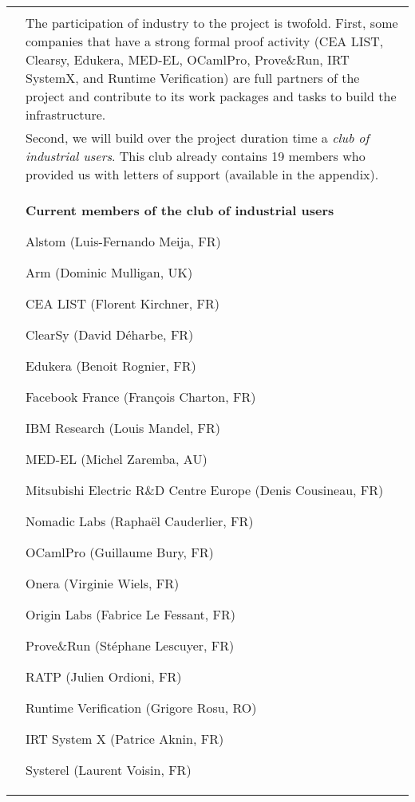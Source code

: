 \begin{longtable}{|p{}|p{}|}
&\\
&
\hspace{0.4cm}
The participation of industry to the project is twofold. First,
some companies that have a strong formal proof activity (CEA
LIST, Clearsy, Edukera, MED-EL, OCamlPro, Prove\&Run, IRT SystemX,
and Runtime Verification) are full partners of the project and
contribute to its work packages and tasks to build the
infrastructure.
\\
&
\hspace{0.4cm}
Second, we will build over the project duration time a {\em club of
  industrial users}. This club already contains
19 members who provided us with letters of support (available in the appendix).
\\
&
\hspace{0.4cm}
\begin{framed}
\begin{center}
  {\bf \Large Current members of the club of industrial users}
\end{center}
\begin{compactitem}%
\item Alstom (Luis-Fernando Meija, FR)
\item Arm (Dominic Mulligan, UK)
\item CEA LIST (Florent Kirchner, FR)
\item ClearSy (David Déharbe, FR)
\item Edukera (Benoit Rognier, FR)
\item Facebook France (François Charton, FR)
\item IBM Research (Louis Mandel, FR)
\item MED-EL (Michel Zaremba, AU)
\item Mitsubishi Electric R\&D Centre Europe (Denis Cousineau, FR)
\item Nomadic Labs (Raphaël Cauderlier, FR)
\item OCamlPro (Guillaume Bury, FR)
\item Onera (Virginie Wiels, FR)
\item Origin Labs (Fabrice Le Fessant, FR)
\item Prove\&Run (Stéphane Lescuyer, FR)
\item RATP (Julien Ordioni, FR)
\item Runtime Verification (Grigore Rosu, RO)
\item IRT System X (Patrice Aknin, FR)
\item Systerel (Laurent Voisin, FR)

\end{compactitem}
\end{framed}
\end{longtable}
